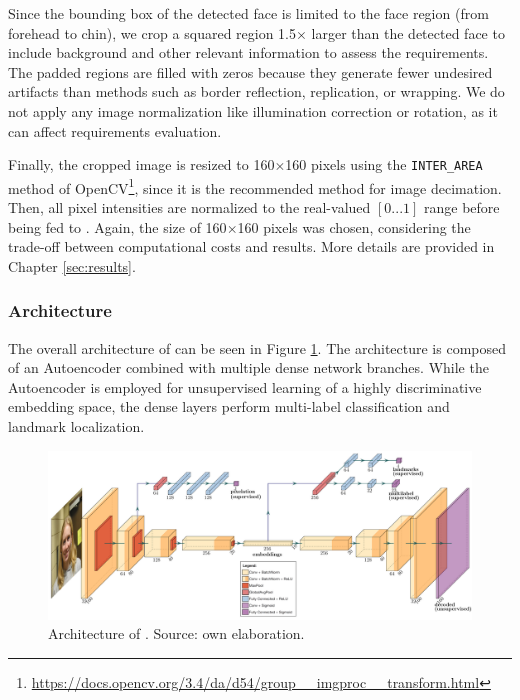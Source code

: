 Since the bounding box of the detected face is limited to the face region (from forehead to chin), we crop a squared region 1.5$\times$ larger than the detected face to include background and other relevant information to assess the requirements. The padded regions are filled with zeros because they generate fewer undesired artifacts than methods such as border reflection, replication, or wrapping. We do not apply any image normalization like illumination correction or rotation, as it can affect requirements evaluation. 
 
Finally, the cropped image is resized to 160$\times$160 pixels using the \texttt{INTER\_AREA} method of OpenCV\footnote{\url{https://docs.opencv.org/3.4/da/d54/group__imgproc__transform.html}}, since it is the recommended method for image decimation. Then, all pixel intensities are normalized to the real-valued $[0...1]$ range before being fed to \methodname. Again, the size of 160$\times$160 pixels was chosen, considering the trade-off between computational costs and results. More details are provided in Chapter \ref{sec:results}. 
 
\subsubsection{Architecture}
 
The overall architecture of \methodname can be seen in Figure \ref{fig:icaonet}. The architecture is composed of an Autoencoder combined with multiple dense network branches. While the Autoencoder is employed for unsupervised learning of a highly discriminative embedding space, the dense layers perform multi-label classification and landmark localization.
 
\begin{figure}[tb]
\centering
\includegraphics[width=\linewidth]{images/icaonet/icaonet.pdf}
\caption{Architecture of \methodname. Source: own elaboration.}
\label{fig:icaonet}
\end{figure}
 
